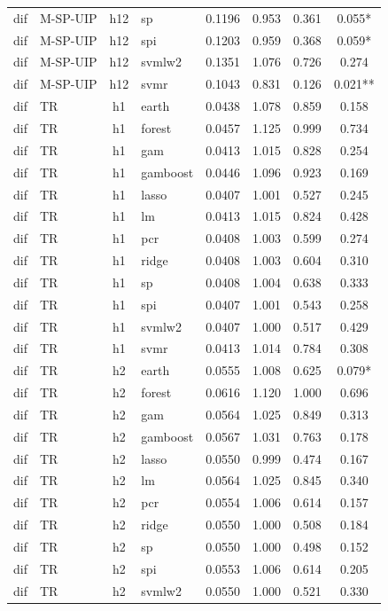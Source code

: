 \begin{ThreePartTable}
\begin{longtable}[t]{llclcccc}
dif & M-SP-UIP & h12 & sp & 0.1196 & 0.953 & 0.361 & 0.055*\\
dif & M-SP-UIP & h12 & spi & 0.1203 & 0.959 & 0.368 & 0.059*\\
dif & M-SP-UIP & h12 & svmlw2 & 0.1351 & 1.076 & 0.726 & 0.274\\
dif & M-SP-UIP & h12 & svmr & 0.1043 & 0.831 & 0.126 & 0.021**\\
\addlinespace
dif & TR & h1 & earth & 0.0438 & 1.078 & 0.859 & 0.158\\
dif & TR & h1 & forest & 0.0457 & 1.125 & 0.999 & 0.734\\
dif & TR & h1 & gam & 0.0413 & 1.015 & 0.828 & 0.254\\
dif & TR & h1 & gamboost & 0.0446 & 1.096 & 0.923 & 0.169\\
dif & TR & h1 & lasso & 0.0407 & 1.001 & 0.527 & 0.245\\
dif & TR & h1 & lm & 0.0413 & 1.015 & 0.824 & 0.428\\
dif & TR & h1 & pcr & 0.0408 & 1.003 & 0.599 & 0.274\\
dif & TR & h1 & ridge & 0.0408 & 1.003 & 0.604 & 0.310\\
dif & TR & h1 & sp & 0.0408 & 1.004 & 0.638 & 0.333\\
dif & TR & h1 & spi & 0.0407 & 1.001 & 0.543 & 0.258\\
dif & TR & h1 & svmlw2 & 0.0407 & 1.000 & 0.517 & 0.429\\
dif & TR & h1 & svmr & 0.0413 & 1.014 & 0.784 & 0.308\\
\addlinespace
dif & TR & h2 & earth & 0.0555 & 1.008 & 0.625 & 0.079*\\
dif & TR & h2 & forest & 0.0616 & 1.120 & 1.000 & 0.696\\
dif & TR & h2 & gam & 0.0564 & 1.025 & 0.849 & 0.313\\
dif & TR & h2 & gamboost & 0.0567 & 1.031 & 0.763 & 0.178\\
dif & TR & h2 & lasso & 0.0550 & 0.999 & 0.474 & 0.167\\
dif & TR & h2 & lm & 0.0564 & 1.025 & 0.845 & 0.340\\
dif & TR & h2 & pcr & 0.0554 & 1.006 & 0.614 & 0.157\\
dif & TR & h2 & ridge & 0.0550 & 1.000 & 0.508 & 0.184\\
dif & TR & h2 & sp & 0.0550 & 1.000 & 0.498 & 0.152\\
dif & TR & h2 & spi & 0.0553 & 1.006 & 0.614 & 0.205\\
dif & TR & h2 & svmlw2 & 0.0550 & 1.000 & 0.521 & 0.330\\

\end{longtable}
\end{ThreePartTable}
